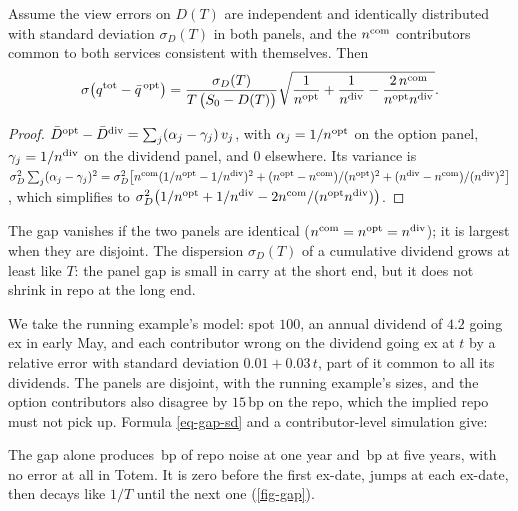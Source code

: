 \begin{corollary}\label{cor-gap}
Assume the view errors on $D(T)$ are independent and identically distributed with standard deviation $\sigma_D(T)$ in
both panels, and the $n^{\mathrm{com}}$ contributors common to both services consistent with themselves. Then
\begin{equation}\label{eq-gap-sd}
\sigma\bigl(q^{\mathrm{tot}}-\bar q^{\,\mathrm{opt}}\bigr)=\frac{\sigma_D(T)}{T\,\bigl(S_0-D(T)\bigr)}
\sqrt{\frac{1}{n^{\mathrm{opt}}}+\frac{1}{n^{\mathrm{div}}}-\frac{2\,n^{\mathrm{com}}}{n^{\mathrm{opt}}n^{\mathrm{div}}}} .
\end{equation}
\end{corollary}
\begin{proof}
$\bar D^{\mathrm{opt}}-\bar D^{\mathrm{div}}=\sum_j(\alpha_j-\gamma_j)\,v_j$, with $\alpha_j=1/n^{\mathrm{opt}}$ on the option panel, $\gamma_j=1/n^{\mathrm{div}}$ on the
dividend panel, and $0$ elsewhere. Its variance is
$\sigma_D^2\sum_j(\alpha_j-\gamma_j)^2=\sigma_D^2\bigl[n^{\mathrm{com}}(1/n^{\mathrm{opt}}-1/n^{\mathrm{div}})^2+(n^{\mathrm{opt}}-n^{\mathrm{com}})/(n^{\mathrm{opt}})^2
+(n^{\mathrm{div}}-n^{\mathrm{com}})/(n^{\mathrm{div}})^2\bigr]$, which simplifies to
$\sigma_D^2\bigl(1/n^{\mathrm{opt}}+1/n^{\mathrm{div}}-2n^{\mathrm{com}}/(n^{\mathrm{opt}}n^{\mathrm{div}})\bigr)$.
\end{proof}

The gap vanishes if the two panels are identical ($n^{\mathrm{com}}=n^{\mathrm{opt}}=n^{\mathrm{div}}$); it is largest when they are disjoint. The
dispersion $\sigma_D(T)$ of a cumulative dividend grows at least like $T$: the panel gap is small in carry at the short
end, but it does not shrink in repo at the long end.

\begin{example}\label{ex-gap}
We take the running example's model: spot $100$, an annual dividend of $\num{4.2}$ going ex in early May, and each
contributor wrong on the dividend going ex at $t$ by a relative error with standard deviation $\num{0.01}+\num{0.03}\,t$,
part of it common to all its dividends. The panels are disjoint, with the running example's sizes, and the option
contributors also disagree by $15$\,bp on the repo, which the implied repo must not pick up. Formula
\eqref{eq-gap-sd} and a contributor-level simulation give:
\begin{center}\end{center}
The gap alone produces \vGapOneY\,bp of repo noise at one year and \vGapFiveY\,bp at five years, with no error at all
in Totem. It is zero before the first ex-date, jumps at each ex-date, then decays like $1/T$ until the next one
(\cref{fig-gap}).
\end{example}

